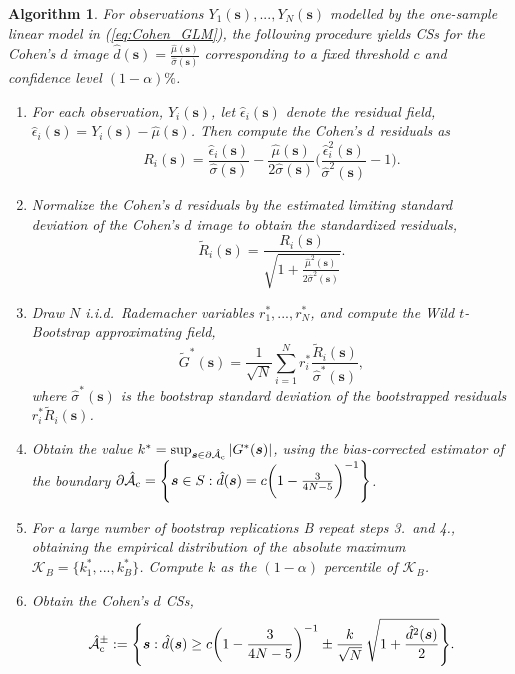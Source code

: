 \newtheorem{algorithm}{Algorithm}
\begin{algorithm}
\label{alg:one}
For observations $Y_{1}(\bm{s}), ..., Y_{N}(\bm{s})$ modelled by the one-sample linear model in (\ref{eq:Cohen_GLM}), the following procedure yields CSs for the Cohen's $d$ image $\hat{d}(\bm{s}) = \frac{\hat{\mu}(\bm{s})}{\hat{\sigma}(\bm{s})}$ corresponding to a fixed threshold $c$ and confidence level $(1 - \alpha)\%$.
\begin{enumerate}
\item For each observation, $Y_i(\bm{s})$, let $\hat{\epsilon}_{i}(\bm{s})$ denote the residual field, $\hat{\epsilon}_{i}(\bm{s}) = Y_{i}(\bm{s}) - \hat{\mu}(\bm{s})$. Then compute the Cohen's $d$ residuals as 
$$R_{i}(\bm{s}) = \frac{\hat{\epsilon}_{i}(\bm{s})}{\hat{\sigma}(\bm{s})} - \frac{\hat{\mu}(\bm{s})}{2\hat{\sigma}(\bm{s})}\Bigg( \frac{\hat{\epsilon}_{i}^{2}(\bm{s})}{\hat{\sigma}^{2}(\bm{s})} - 1 \Bigg).$$ 
\item Normalize the Cohen's $d$ residuals by the estimated limiting standard deviation of the Cohen's $d$ image to obtain the standardized residuals,
$$\tilde{R}_{i}(\bm{s}) = \frac{R_{i}(\bm{s})}{\sqrt{1 + \frac{\hat{\mu}^{2}(\bm{s})}{2\hat{\sigma}^{2}(\bm{s})}}}.$$ 
\item Draw $N$ i.i.d.\ Rademacher variables $r_{1}^{*}, ..., r_{N}^{*}$, and compute the Wild $t$-Bootstrap approximating field,
$$\tilde{G}^{*}(\bm{s}) = \frac{1}{\sqrt{N}}\sum_{i=1}^{N} r^*_i\frac{\tilde{R}_{i}(\bm{s})}{\hat{\sigma}^*(\bm{s})},$$
where $\hat{\sigma}^{*}(\bm{s})$ is the bootstrap standard deviation of the bootstrapped residuals $r_{i}^{*}\tilde{R}_{i}(\bm{s})$. 
\item Obtain the value $k^{*} = \sup_{\bm{s}\in\operatorname{\partial\hat{\mathcal{A}}_{c}}}|G^{*}(\bm{s})|$, using the bias-corrected estimator of the boundary $\operatorname{\partial\hat{\mathcal{A}}_{c}} = \Bigg\{\bm{s} \in S : \hat{d}(\bm{s}) = c\bigg(1 - \frac{3}{4N - 5}\bigg)^{-1} \Bigg\}$.
\item For a large number of bootstrap replications B repeat steps 3.\ and 4., obtaining the empirical distribution of the absolute maximum $\mathcal{K}_{B} = \{k_{1}^{*}, ..., k_{B}^{*}\}$. Compute $k$ as the $(1 - \alpha)$ percentile of $\mathcal{K}_{B}$.
\item Obtain the Cohen's $d$ CSs,
$$\operatorname{\hat{\mathcal{A}}_{c}^\pm} := \Bigg\{\bm{s} : \hat{d}(\bm{s}) \geq c\bigg(1 - \frac{3}{4N - 5}\bigg)^{-1} \pm \frac{k}{{\sqrt{N}}}\, \sqrt{1 + \frac{\hat{d}^{2}({\bm{s}})}{2}}\Bigg\}.$$
\end{enumerate}
\end{algorithm}

